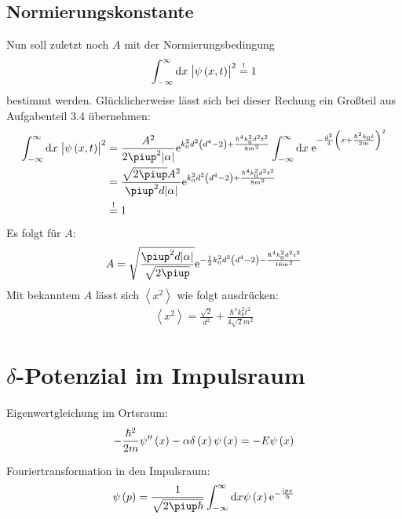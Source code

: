 \subsection{Normierungskonstante}
Nun soll zuletzt noch $A$ mit der Normierungsbedingung 
\[
	\int_{-\infty}^{\infty}\dif x\;\abs{\psi\del{x,t}}^2\overset{!}{=}1
\]
bestimmt werden. Glücklicherweise lässt sich bei dieser Rechung ein Großteil aus Aufgabenteil 3.4 übernehmen:
\begin{align*}
	\int_{-\infty}^{\infty}\dif x\;\abs{\psi\del{x,t}}^2&=\frac{A^2}{2\piup^2\abs{\alpha}}\ee^{k_0^2d^2\del{d^4-2}+\frac{\hbar^4k_0^2d^2t^2}{8m^2}}
	\int_{-\infty}^{\infty}\dif x\;\ee^{-\frac{d^2}{4}\del{x+\frac{\hbar^2k_0t}{2m}}^2}\\
	&=\frac{\sqrt{2\piup}A^2}{\piup^2d\abs{\alpha}}\ee^{k_0^2d^2\del{d^4-2}+\frac{\hbar^4k_0^2d^2t^2}{8m^2}}\\
	&\overset{!}{=}1
\end{align*}
Es folgt für $A$:
\begin{align*}
	A=\sqrt{\frac{\piup^2d\abs{\alpha}}{\sqrt{2\piup}}}\ee^{-\half k_0^2d^2\del{d^4-2}-\frac{\hbar^4k_0^2d^2t^2}{16m^2}}
\end{align*}
Mit bekanntem $A$ lässt sich $\left<x^2\right>$ wie folgt ausdrücken:
\begin{align*}
	\left<x^2\right>=\frac{\sqrt{2}}{d^2}+\frac{\hbar^4k_0^2t^2}{4\sqrt{2}m^2}
\end{align*}


\section{$\delta$-Potenzial im Impulsraum}
Eigenwertgleichung im Ortsraum:
\begin{align*}
 - \frac{\hbar^2}{2m}\psi''\del{x} -\alpha\delta\del{x}\psi\del{x} = -E \psi\del{x}
\end{align*}

Fouriertransformation in den Impulsraum:
\begin{align*}
 \psi\del{p} = \frac{1}{\sqrt{2\piup\hbar}}\int^\infty_{-\infty} \dif x \psi\del{x} \ee^{- \frac{\ii p x}{\hbar}}
\end{align*}




